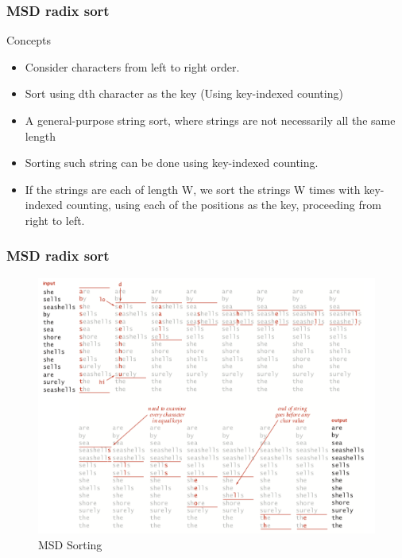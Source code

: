\documentclass[11pt]{beamer}
\begin{document}
\begin{frame}
	\frametitle{MSD radix sort}
	\begin{block}{Concepts}
		\begin{itemize}
			\item Consider characters from left to right order.
			\item Sort using dth character as the key (Using key-indexed counting)
			\item A general-purpose string sort, where strings are not necessarily all the same length
			\item Sorting such string can be done using key-indexed counting. 
			\item If the strings are each of length W,
			we sort the strings W times with key-indexed counting, using
			each of the positions as the key, proceeding from right to left.
		\end{itemize}
	\end{block}
\end{frame}
\begin{frame}
	\frametitle{MSD radix sort}
	\begin{figure}
		\centering
		\includegraphics[width=0.85\linewidth]{"Screenshot 2020-10-20 at 9.52.19 AM"}
		\caption{MSD Sorting}
		\label{fig:screenshot-2020-10-20-at-9}
	\end{figure}
	
\end{frame}
\end{document}
